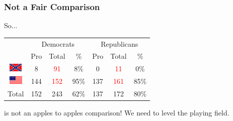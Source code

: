 \documentclass[slides]{beamer}\usepackage[]{graphicx}\usepackage[]{color}
\newcommand{\blue}[1]{\textcolor{blue2}{#1}}
\begin{document}
\begin{frame}
\frametitle{Not a Fair Comparison}
So...

\begin{center}
	\begin{tabular}{c|ccc|ccc}
     & \multicolumn{3}{c|}{Democrats}  & \multicolumn{3}{c}{Republicans} \\ 
     & Pro & Total & \% & Pro & Total & \% \\ 
     \hline
     \includegraphics[height=0.4cm]{conf} & 8 & \textcolor{red}{91} & \blue{8\%} & 0 & \textcolor{red}{11} & 0\% \\ 
	 \includegraphics[height=0.4cm]{union} & 144 & \textcolor{red}{152} & \blue{95\%} & 137 & \textcolor{red}{161} & 85\% \\ 
    \hline
     Total & 152 & 243 & 62\% & 137 & 172 & \blue{80\%} \\ 
  \end{tabular}
\end{center}
is not an apples to apples comparison!  We need to level the playing field.

\end{frame}
\end{document}
